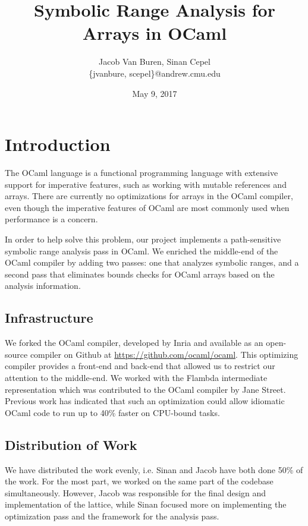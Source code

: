 \documentclass[11pt]{article}
\title{Symbolic Range Analysis for Arrays in OCaml}
\date{May 9, 2017}
\author{Jacob Van Buren, Sinan Cepel \\ \{jvanbure, scepel\}@andrew.cmu.edu}
\begin{document}
\maketitle

\setlength{\headheight}{26pt}
\section{Introduction}

The OCaml language is a functional programming language with extensive support for imperative features, such as working with mutable references and arrays. There are currently no optimizations for arrays in the OCaml compiler, even though the imperative features of OCaml are most commonly used when performance is a concern.

In order to help solve this problem, our project implements a path-sensitive symbolic range analysis pass in OCaml. We enriched the middle-end of the OCaml compiler by adding two passes: one that analyzes symbolic ranges, and a second pass that eliminates bounds checks for OCaml arrays based on the analysis information.

\subsection{Infrastructure}

We forked the OCaml compiler, developed by Inria and available as an open-source compiler on Github at \url{https://github.com/ocaml/ocaml}. This optimizing compiler provides a front-end and back-end that allowed us to restrict our attention to the middle-end. We worked with the Flambda intermediate representation which was contributed to the OCaml compiler by Jane Street. Previous work has indicated that such an optimization could allow idiomatic OCaml code to run up to 40\% faster on CPU-bound tasks\cite{wurthinger2007array}.

\subsection{Distribution of Work}

We have distributed the work evenly, i.e. Sinan and Jacob have both done 50\% of the work. For the most part, we worked on the same part of the codebase simultaneously. However, Jacob was responsible for the final design and implementation of the lattice, while Sinan focused more on implementing the optimization pass and the framework for the analysis pass.
\end{document}
